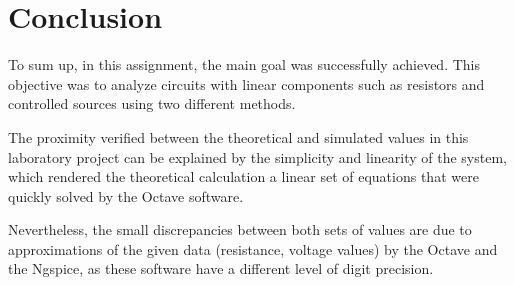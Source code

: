 \section{Conclusion}
\label{sec:conclusion}

To sum up, in this assignment, the main goal was successfully achieved. This objective was to analyze circuits with linear components such as resistors and controlled sources using two different methods. 

The proximity verified between the theoretical and simulated values in this laboratory project can be explained by the simplicity and linearity of the system, which rendered the theoretical calculation a linear set of equations that were quickly solved by the Octave software.

Nevertheless, the small discrepancies between both sets of values are due to approximations of the given data (resistance, voltage values) by the Octave and the Ngspice, as these software have a different level of digit precision.

